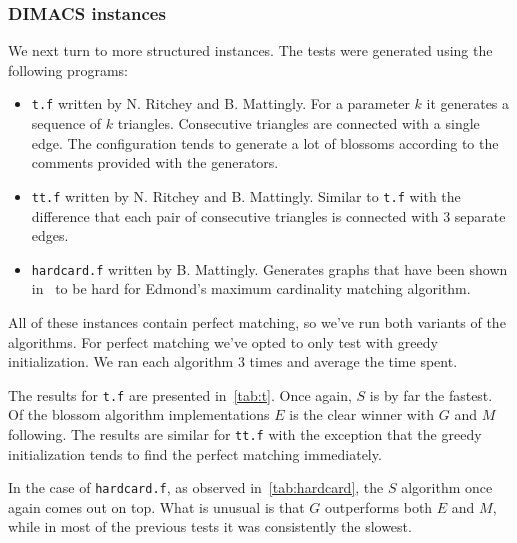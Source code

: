 \subsubsection*{DIMACS instances}

We next turn to more structured instances. The tests were generated using the following programs:

\begin{itemize}
    \item \texttt{t.f} written by N. Ritchey and B. Mattingly. For a parameter $k$ it generates a sequence of $k$ triangles. Consecutive triangles are connected with a single edge. The configuration tends to generate a lot of blossoms according to the comments provided with the generators.
    \item \texttt{tt.f} written by N. Ritchey and B. Mattingly. Similar to \texttt{t.f} with the difference that each pair of consecutive triangles is connected with $3$ separate edges.
    \item \texttt{hardcard.f} written by B. Mattingly. Generates graphs that have been shown in~\cite{gabow1976efficient} to be hard for Edmond's maximum cardinality matching algorithm.
\end{itemize}

All of these instances contain perfect matching, so we've run both variants of the algorithms. For perfect matching we've opted to only test with greedy initialization. We ran each algorithm $3$ times and average the time spent.

The results for \texttt{t.f} are presented in~\ref{tab:t}. Once again, $S$ is by far the fastest. Of the blossom algorithm implementations $E$ is the clear winner with $G$ and $M$ following. The results are similar for \texttt{tt.f} with the exception that the greedy initialization tends to find the perfect matching immediately. 

In the case of \texttt{hardcard.f}, as observed in~\ref{tab:hardcard}, the $S$ algorithm once again comes out on top. What is unusual is that $G$ outperforms both $E$ and $M$, while in most of the previous tests it was consistently the slowest.

